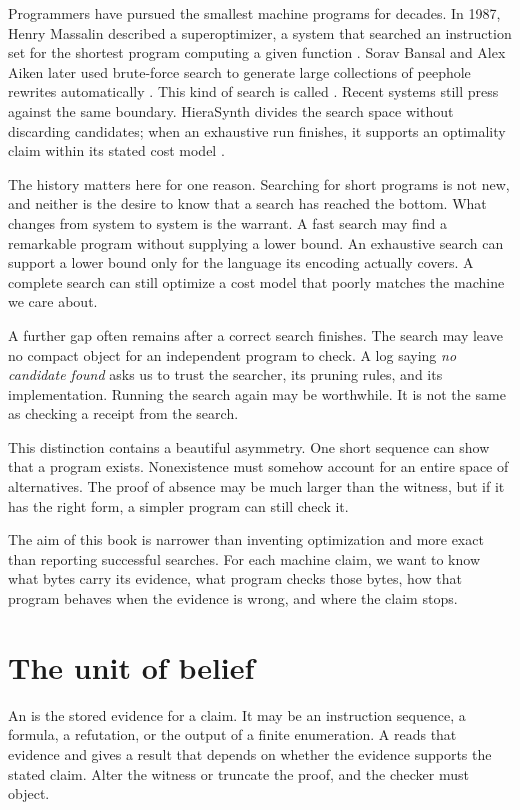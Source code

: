 Programmers have pursued the smallest machine programs for decades. In 1987,
Henry Massalin described a superoptimizer, a system that searched an
instruction set for the shortest program computing a given function
\autocite{massalin1987}. Sorav Bansal and Alex Aiken later used brute-force
search to generate large collections of peephole rewrites automatically
\autocite{bansalaiken2006}. This kind of search is called
. Recent systems still press against the same
boundary. HieraSynth divides the search space without discarding candidates;
when an exhaustive run finishes, it supports an optimality claim within its
stated cost model \autocite{lubodik2025}.

The history matters here for one reason. Searching for short programs is not
new, and neither is the desire to know that a search has reached the bottom.
What changes from system to system is the warrant. A fast search may find a
remarkable program without supplying a lower bound. An exhaustive search can
support a lower bound only for the language its encoding actually covers. A
complete search can still optimize a cost model that poorly matches the
machine we care about.

A further gap often remains after a correct search finishes. The search may
leave no compact object for an independent program to check. A log saying
\emph{no candidate found} asks us to trust the searcher, its pruning rules,
and its implementation. Running the search again may be worthwhile. It is not
the same as checking a receipt from the search.

This distinction contains a beautiful asymmetry. One short sequence can show
that a program exists. Nonexistence must somehow account for an entire space
of alternatives. The proof of absence may be much larger than the witness,
but if it has the right form, a simpler program can still check it.

The aim of this book is narrower than inventing optimization and more exact
than reporting successful searches. For each machine claim, we want to know
what bytes carry its evidence, what program checks those bytes, how that
program behaves when the evidence is wrong, and where the claim stops.

\section{The unit of belief}
\label{sec:intro-object}

An  is the stored evidence for a claim. It may be an
instruction sequence, a formula, a refutation, or the output of a finite
enumeration. A  reads that evidence and gives a result that
depends on whether the evidence supports the stated claim. Alter the witness
or truncate the proof, and the checker must object.

